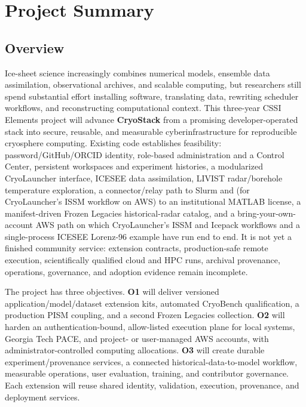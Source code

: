\section*{Project Summary}

\subsection*{Overview}
Ice-sheet science increasingly combines numerical models, ensemble data
assimilation, observational archives, and scalable computing, but researchers
still spend substantial effort installing software, translating data,
rewriting scheduler workflows, and reconstructing computational context. This
three-year CSSI Elements project will advance \textbf{CryoStack} from a
promising developer-operated stack into secure, reusable, and measurable
cyberinfrastructure for reproducible cryosphere computing. Existing code
establishes feasibility: password/GitHub/ORCID identity, role-based
administration and a Control Center, persistent workspaces and experiment
histories, a modularized CryoLauncher interface, ICESEE data assimilation,
LIVIST radar/borehole temperature exploration, a connector/relay path to
Slurm and (for CryoLauncher's ISSM workflow on AWS) to an institutional MATLAB
license, a manifest-driven Frozen Legacies historical-radar catalog,
and a bring-your-own-account AWS path on which CryoLauncher's ISSM and Icepack
workflows and a single-process ICESEE Lorenz-96 example have run end to end. It is not yet a finished community
service: extension contracts, production-safe remote execution, scientifically
qualified cloud and HPC runs, archival provenance, operations, governance, and
adoption evidence remain incomplete.

The project has three objectives. \textbf{O1} will deliver versioned
application/model/dataset extension kits, automated CryoBench qualification, a
production PISM coupling, and a second Frozen Legacies collection.
\textbf{O2} will harden an authentication-bound, allow-listed execution plane
for local systems, Georgia Tech PACE, and project- or user-managed AWS
accounts, with administrator-controlled computing allocations. \textbf{O3} will create durable experiment/provenance services, a
connected historical-data-to-model workflow, measurable operations, user
evaluation, training, and contributor governance. Each extension will reuse
shared identity, validation, execution, provenance, and deployment services.

